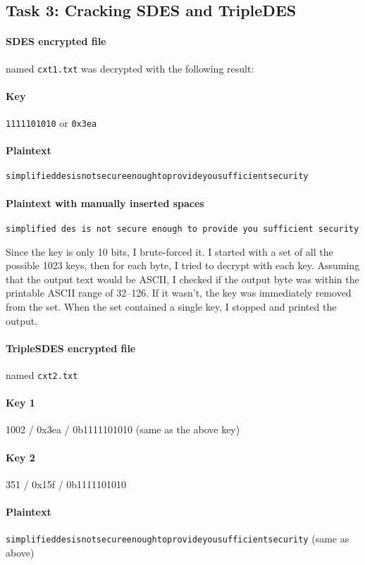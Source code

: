 \documentclass[a4paper,english,12pt]{article}
\begin{document}
\subsection{Task 3: Cracking SDES and TripleDES}

\paragraph{SDES encrypted file} named \texttt{cxt1.txt} was decrypted with the
following result:

\paragraph{Key} \texttt{1111101010} or \texttt{0x3ea}

\paragraph{Plaintext}
\texttt{simplifieddesisnotsecureenoughtoprovideyousufficientsecurity}

\paragraph{Plaintext with manually inserted spaces}
\texttt{simplified des is not secure enough to provide you sufficient security}

Since the key is only 10 bits, I brute-forced it. I started with a set of all
the possible 1023 keys, then for each byte, I tried to decrypt with each key.
Assuming that the output text would be ASCII, I checked if the output byte was
within the printable ASCII range of 32--126. If it wasn't, the key was
immediately removed from the set. When the set contained a single key, I
stopped and printed the output.

\paragraph{TripleSDES encrypted file} named \texttt{cxt2.txt}

\paragraph{Key 1} 1002 / 0x3ea / 0b1111101010 (same as the above key)
\paragraph{Key 2} 351 / 0x15f / 0b1111101010
\paragraph{Plaintext}
\texttt{simplifieddesisnotsecureenoughtoprovideyousufficientsecurity} (same as
above)
\end{document}
